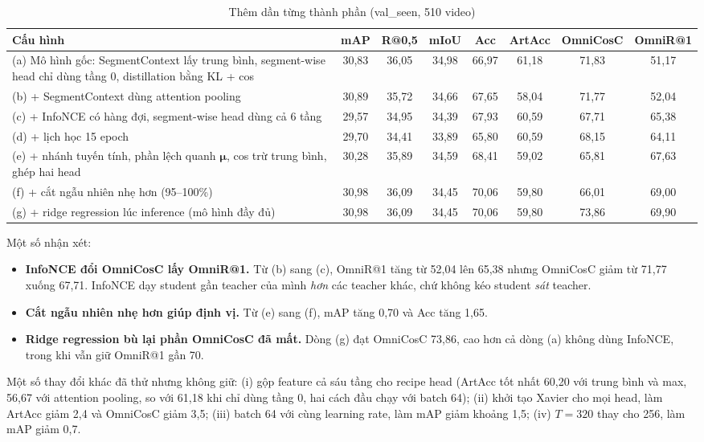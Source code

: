 \documentclass{IEEEtran}
\begin{document}
\begin{table}[t]
\caption{Thêm dần từng thành phần (val\_seen, 510 video)}
\label{tab:ablation}
\centering
\footnotesize
\setlength{\tabcolsep}{4pt}
\begin{tabular}{|p{7.6cm}|c|c|c|c|c|c|c|}
\hline
Cấu hình & mAP & R@0,5 & mIoU & Acc & ArtAcc & OmniCosC & OmniR@1 \\
\hline
(a) Mô hình gốc: SegmentContext lấy trung bình, segment-wise head chỉ dùng tầng 0, distillation bằng KL + cos & 30,83 & 36,05 & 34,98 & 66,97 & 61,18 & 71,83 & 51,17 \\
(b) + SegmentContext dùng attention pooling & 30,89 & 35,72 & 34,66 & 67,65 & 58,04 & 71,77 & 52,04 \\
(c) + InfoNCE có hàng đợi, segment-wise head dùng cả 6 tầng & 29,57 & 34,95 & 34,39 & 67,93 & 60,59 & 67,71 & 65,38 \\
(d) + lịch học 15 epoch & 29,70 & 34,41 & 33,89 & 65,80 & 60,59 & 68,15 & 64,11 \\
(e) + nhánh tuyến tính, phần lệch quanh $\boldsymbol{\mu}$, cos trừ trung bình, ghép hai head & 30,28 & 35,89 & 34,59 & 68,41 & 59,02 & 65,81 & 67,63 \\
(f) + cắt ngẫu nhiên nhẹ hơn (95--100\%) & 30,98 & 36,09 & 34,45 & 70,06 & 59,80 & 66,01 & 69,00 \\
(g) + ridge regression lúc inference (mô hình đầy đủ) & 30,98 & 36,09 & 34,45 & 70,06 & 59,80 & 73,86 & 69,90 \\
\hline
\end{tabular}
\end{table}

Một số nhận xét:
\begin{itemize}
\item \textbf{InfoNCE đổi OmniCosC lấy OmniR@1.} Từ (b) sang (c), OmniR@1 tăng từ 52,04 lên 65,38 nhưng OmniCosC giảm từ 71,77 xuống 67,71. InfoNCE dạy student gần teacher của mình \emph{hơn} các teacher khác, chứ không kéo student \emph{sát} teacher.
\item \textbf{Cắt ngẫu nhiên nhẹ hơn giúp định vị.} Từ (e) sang (f), mAP tăng 0,70 và Acc tăng 1,65.
\item \textbf{Ridge regression bù lại phần OmniCosC đã mất.} Dòng (g) đạt OmniCosC 73,86, cao hơn cả dòng (a) không dùng InfoNCE, trong khi vẫn giữ OmniR@1 gần 70.
\end{itemize}

Một số thay đổi khác đã thử nhưng không giữ: (i) gộp feature cả sáu tầng cho recipe head (ArtAcc tốt nhất 60,20 với trung bình và max, 56,67 với attention pooling, so với 61,18 khi chỉ dùng tầng 0, hai cách đầu chạy với batch 64); (ii) khởi tạo Xavier cho mọi head, làm ArtAcc giảm 2,4 và OmniCosC giảm 3,5; (iii) batch 64 với cùng learning rate, làm mAP giảm khoảng 1,5; (iv) $T = 320$ thay cho 256, làm mAP giảm 0,7.
\end{document}
